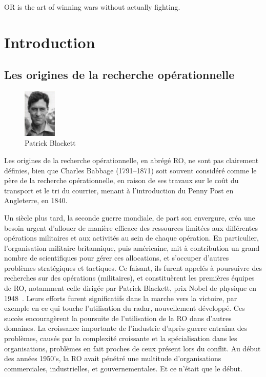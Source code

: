 \begin{savequote}
  OR is the art of winning wars without actually fighting.
\end{savequote}

\chapter{Introduction}

\section{Les origines de la recherche opérationnelle}
\label{sec:histoire}

\begin{figure}
  \begin{center}
    \includegraphics[width=0.14\textwidth]{Blackett-large.jpg}
  \end{center}
  \caption{Patrick Blackett}
\end{figure}

Les origines de la recherche opérationnelle, en abrégé RO, ne sont pas clairement définies, bien que Charles Babbage (1791--1871) soit souvent considéré comme le père de la recherche opérationnelle, en raison de ses travaux sur le coût du transport et le tri du courrier, menant à l'introduction du Penny Post en Angleterre, en 1840. %

Un siècle plus tard, la seconde guerre mondiale, de part son envergure, créa une besoin urgent d'allouer de manière efficace des ressources limitées aux différentes opérations militaires et aux activités au sein de chaque opération.
En particulier, l'organisation militaire britannique, puis américaine, mit à contribution un grand nombre de scientifiques pour gérer ces allocations, et s'occuper d'autres problèmes stratégiques et tactiques.
Ce faisant, ils furent appelés à poursuivre des recherches sur des opérations (militaires), et constituèrent les premières équipes de RO, notamment celle dirigée par Patrick Blackett, prix Nobel de physique en 1948~\cite{Kirb03}.
Leurs efforts furent significatifs dans la marche vers la victoire, par exemple en ce qui touche l'utilisation du radar, nouvellement développé.
Ces succès encouragèrent la poursuite de l'utilisation de la RO dans d'autres domaines.
La croissance importante de l'industrie d'après-guerre entraîna des problèmes, causés par la complexité croissante et la spécialisation dans les organisations, problèmes en fait proches de ceux présent lors du conflit.
Au début des années 1950's, la RO avait pénétré une multitude d'organisations commerciales, industrielles, et gouvernementales.
Et ce n'était que le début.

